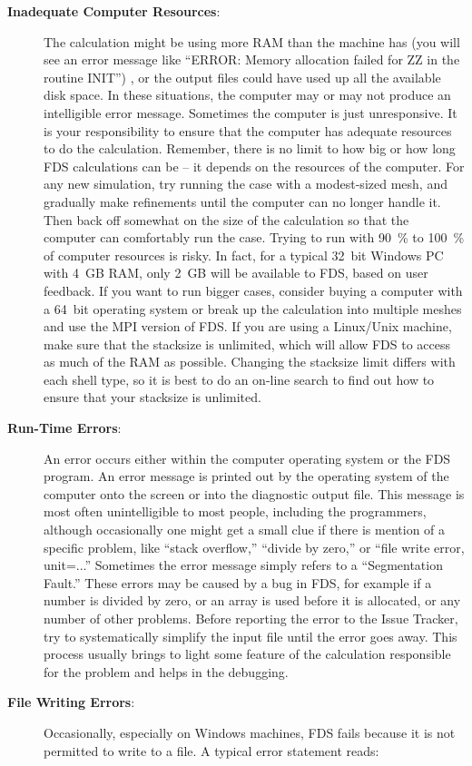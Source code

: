\documentclass[11pt]{book}
\begin{document}
\begin{description}
\item[{\bf Inadequate Computer Resources}:] The calculation might be using more RAM than the machine has (you will see an error message like ``ERROR: Memory allocation failed for ZZ in the routine INIT'') , or the output files could have used up all the available disk space. In these situations, the computer may or may not produce an intelligible error message. Sometimes the computer is just unresponsive. It is your responsibility to ensure that the computer has adequate resources to do the calculation. Remember, there is no limit to how big or how long FDS calculations can be -- it depends on the resources of the computer. For any new simulation, try running the case with a modest-sized mesh, and gradually make refinements until the computer can no longer handle it. Then back off somewhat on the size of the calculation so that the computer can comfortably run the case. Trying to run with 90~\% to 100~\% of computer resources is risky. In fact, for a typical 32~bit Windows PC with 4~GB RAM, only 2~GB will be available to FDS, based on user feedback. If you want to run bigger cases, consider buying a computer with a 64~bit operating system or break up the calculation into multiple meshes and use the MPI version of FDS. If you are using a Linux/Unix machine, make sure that the stacksize is unlimited, which will allow FDS to access as much of the RAM as possible. Changing the stacksize limit differs with each shell type, so it is best to do an on-line search to find out how to ensure that your stacksize is unlimited.
\item[{\bf Run-Time Errors}:] An error occurs either within the computer operating system or the FDS program. An error message is printed out by the operating system of the computer onto the screen or into the diagnostic output file. This message is most often unintelligible to most people, including the programmers, although occasionally one might get a small clue if there is mention of a specific problem, like ``stack overflow,'' ``divide by zero,'' or ``file write error, unit=...'' Sometimes the error message simply refers to a ``Segmentation Fault.'' These errors may be caused by a bug in FDS, for example if a number is divided by zero, or an array is used before it is allocated, or any number of other problems. Before reporting the error to the Issue Tracker, try to systematically simplify the input file until the error goes away. This process usually brings to light some feature of the calculation responsible for the problem and helps in the debugging.
\item[{\bf File Writing Errors}:] Occasionally, especially on Windows machines, FDS fails because it is not permitted to write to a file. A typical error statement reads:

\end{description}
\end{document}
